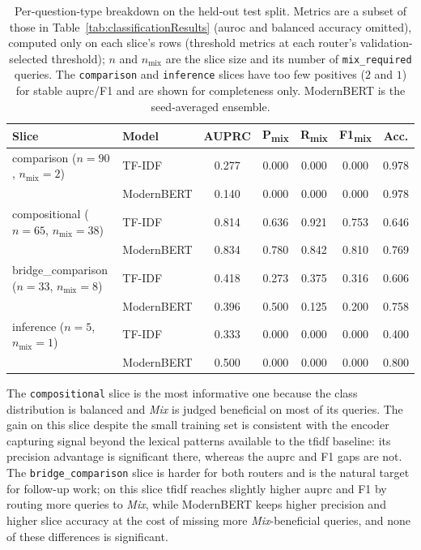 \documentclass[english, bibtex]{kththesis}               %
\numberwithin{listing}{chapter}
\begin{document}
\begin{table}[!ht]
\centering
\small
\setlength{\tabcolsep}{5pt}
\renewcommand{\arraystretch}{1.1}
\caption[Per-question-type breakdown on the held-out test split]{Per-question-type breakdown on the held-out test split. Metrics are a subset of those in Table~\ref{tab:classificationResults} (\gls{auroc} and balanced accuracy omitted), computed only on each slice's rows (threshold metrics at each router's validation-selected threshold); $n$ and $n_{\text{mix}}$ are the slice size and its number of \texttt{mix\_required} queries. The \texttt{comparison} and \texttt{inference} slices have too few positives ($2$ and $1$) for stable \gls{auprc}/F1 and are shown for completeness only. ModernBERT is the seed-averaged ensemble.}
\label{tab:perQuestionType}
\begin{tabular}{l|l|ccccc}
\textbf{Slice} & \textbf{Model} & \textbf{AUPRC} & \textbf{P\textsubscript{mix}} & \textbf{R\textsubscript{mix}} & \textbf{F1\textsubscript{mix}} & \textbf{Acc.} \\
\hline
\makecell[l]{comparison\\($n = 90$, $n_{\text{mix}} = 2$)} & TF-IDF & 0.277 & 0.000 & 0.000 & 0.000 & 0.978 \\
 & ModernBERT & 0.140 & 0.000 & 0.000 & 0.000 & 0.978 \\
\hline
\makecell[l]{compositional\\($n = 65$, $n_{\text{mix}} = 38$)} & TF-IDF & 0.814 & 0.636 & 0.921 & 0.753 & 0.646 \\
 & ModernBERT & 0.834 & 0.780 & 0.842 & 0.810 & 0.769 \\
\hline
\makecell[l]{bridge\_comparison\\($n = 33$, $n_{\text{mix}} = 8$)} & TF-IDF & 0.418 & 0.273 & 0.375 & 0.316 & 0.606 \\
 & ModernBERT & 0.396 & 0.500 & 0.125 & 0.200 & 0.758 \\
\hline
\makecell[l]{inference\\($n = 5$, $n_{\text{mix}} = 1$)} & TF-IDF & 0.333 & 0.000 & 0.000 & 0.000 & 0.400 \\
 & ModernBERT & 0.500 & 0.000 & 0.000 & 0.000 & 0.800 \\
\end{tabular}
\end{table}


The \texttt{compositional} slice is the most informative one because the class distribution is balanced and \emph{Mix} is judged beneficial on most of its queries. The gain on this slice despite the small training set is consistent with the encoder capturing signal beyond the lexical patterns available to the \gls{tfidf} baseline: its precision advantage is significant there, whereas the \gls{auprc} and F1 gaps are not. The \texttt{bridge\_comparison} slice is harder for both routers and is the natural target for follow-up work; on this slice \gls{tfidf} reaches slightly higher \gls{auprc} and F1 by routing more queries to \emph{Mix}, while ModernBERT keeps higher precision and higher slice accuracy at the cost of missing more \emph{Mix}-beneficial queries, and none of these differences is significant.
\end{document}
